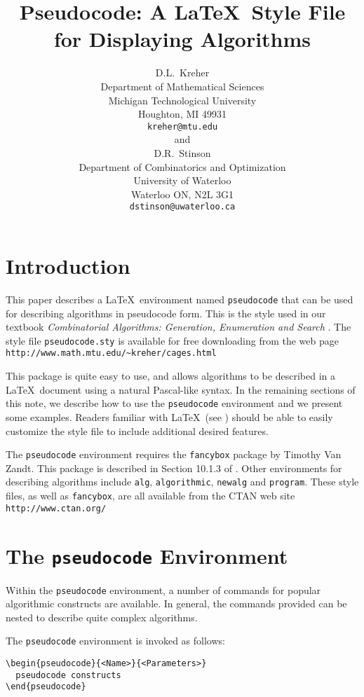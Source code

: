 \documentclass{article}
\title{Pseudocode: A \LaTeX\  Style File for Displaying Algorithms}
\author{
D.L.\ Kreher\\
Department of Mathematical Sciences\\
Michigan Technological University \\ 
Houghton, MI 49931\\
{\tt kreher@mtu.edu}\\[1ex]
and \\[1ex]
D.R.\ Stinson\\
Department of Combinatorics and Optimization\\
University of Waterloo\\
Waterloo ON, N2L 3G1\\
{\tt dstinson@uwaterloo.ca}
}
\newcommand{\keyword}[1]{\texttt{#1}}
\begin{document}

\maketitle

\section{Introduction}

This paper describes a \LaTeX\  environment named \keyword{pseudocode} that can be used
for describing algorithms in pseudocode form.  This is the style used
in our %
textbook {\em Combinatorial Algorithms: Generation, Enumeration and Search}
\cite{cages}.  The style file \keyword{pseudocode.sty} is available for free
downloading from the web page
\verb+http://www.math.mtu.edu/~kreher/cages.html+

This package is quite easy to use, and allows algorithms to be described 
in a \LaTeX\  document using a natural Pascal-like syntax.  In the remaining sections
of this note, we describe how to use the \keyword{pseudocode} environment
and we present some examples.  Readers familiar with \LaTeX\ 
(see \cite{lamport}) should be
able to easily customize the style file to include additional desired features.

The \keyword{pseudocode} environment requires the \keyword{fancybox}
package by Timothy Van Zandt.  This package is described in 
Section 10.1.3 of \cite{LC}.
Other environments for describing algorithms include
\keyword{alg}, \keyword{algorithmic}, \keyword{newalg} and \keyword{program}.
These style files, as well as \keyword{fancybox}, are all available from the CTAN web site
\verb+http://www.ctan.org/+

\section{The \keyword{pseudocode} Environment}

Within the \keyword{pseudocode} environment, a number of commands for 
popular algorithmic constructs are available.
In general, the commands provided can be nested to
describe quite complex algorithms. 

The \keyword{pseudocode} environment is  invoked
as follows:
\begin{verbatim}
\begin{pseudocode}{<Name>}{<Parameters>}
  pseudocode constructs
\end{pseudocode}
\end{verbatim}
\end{document}
